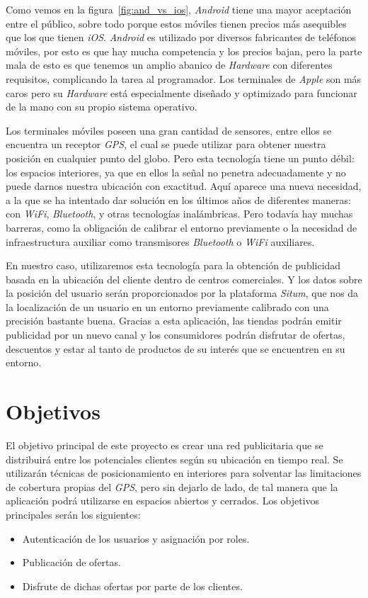 Como vemos en la figura~\ref{fig:and_vs_ios}, \textit{Android} tiene una mayor aceptación entre el público, sobre todo porque estos móviles tienen precios más asequibles que los que tienen \textit{iOS}. \textit{Android} es utilizado por diversos fabricantes de teléfonos móviles, por esto es que hay mucha competencia y los precios bajan, pero la parte mala de esto es que tenemos un amplio abanico de \textit{Hardware} con diferentes requisitos, complicando la tarea al programador. Los terminales de \textit{Apple} son más caros pero su \textit{Hardware} está especialmente diseñado y optimizado para funcionar de la mano con su propio sistema operativo.

Los terminales móviles poseen una gran cantidad de sensores, entre ellos se encuentra un receptor \textit{GPS}, el cual se puede utilizar para obtener nuestra posición en cualquier punto del globo. Pero esta tecnología tiene un punto débil: los espacios interiores, ya que en ellos la señal no penetra adecuadamente y no puede darnos nuestra ubicación con exactitud. Aquí aparece una nueva necesidad, a la que se ha intentado dar solución en los últimos años de diferentes maneras: con \textit{WiFi}, \textit{Bluetooth}, y otras tecnologías inalámbricas. Pero todavía hay muchas barreras, como la obligación de calibrar el entorno previamente o la necesidad de infraestructura auxiliar como transmisores \textit{Bluetooth} o \textit{WiFi} auxiliares.

En nuestro caso, utilizaremos esta tecnología para la obtención de publicidad basada en la ubicación del cliente dentro de centros comerciales. Y los datos sobre la posición del usuario serán proporcionados por la plataforma \textit{Situm}, que nos da la localización de un usuario en un entorno previamente calibrado con una precisión bastante buena. Gracias a esta aplicación, las tiendas podrán emitir publicidad por un nuevo canal y los consumidores podrán disfrutar de ofertas, descuentos y estar al tanto de productos de su interés que se encuentren en su entorno.


\section{Objetivos}
El objetivo principal de este proyecto es crear una red publicitaria que se distribuirá entre los potenciales clientes según su ubicación en tiempo real. Se utilizarán técnicas de posicionamiento en interiores para solventar las limitaciones de cobertura propias del \textit{GPS}, pero sin dejarlo de lado, de tal manera que la aplicación podrá utilizarse en espacios abiertos y cerrados. Los objetivos principales serán los siguientes:
\begin{itemize}
\item Autenticación de los usuarios y asignación por roles.
\item Publicación de ofertas.
\item Disfrute de dichas ofertas por parte de los clientes.
\end{itemize}

